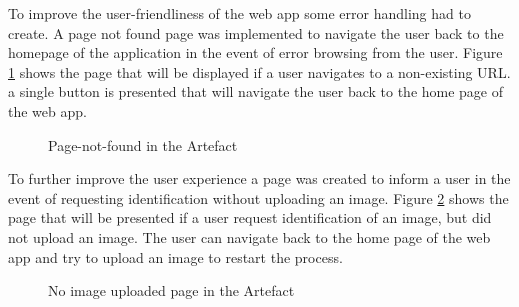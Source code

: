 To improve the user-friendliness of the web app some error handling had to create. A page not found page was implemented to navigate the user back to the homepage of the application in the event of error browsing from the user. Figure \ref{fig:404} shows the page that will be displayed if a user navigates to a non-existing URL. a single button is presented that will navigate the user back to the home page of the web app.

\begin{figure}[H]%
\centering
{}%
\caption{Page-not-found in the Artefact}%
\label{fig:404}%
\end{figure}

To further improve the user experience a page was created to inform a user in the event of requesting identification without uploading an image. Figure \ref{fig:500} shows the page that will be presented if a user request identification of an image, but did not upload an image. The user can navigate back to the home page of the web app and try to upload an image to restart the process.

\begin{figure}[H]%
\centering
{}%
\caption{No image uploaded page in the Artefact}%
\label{fig:500}%
\end{figure}

